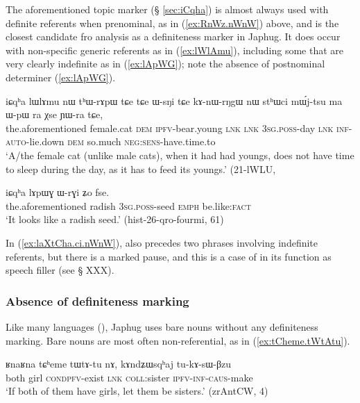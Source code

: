 The aforementioned topic marker  (§ \ref{sec:iCqha}) is almost always used with definite referents when prenominal, as in (\ref{ex:RnWz.nWnW}) above, and is the closest candidate fro analysis as a definiteness marker in Japhug. It does occur with non-specific generic referents as in (\ref{ex:lWlAmu}), including some that are very clearly indefinite as in (\ref{ex:lApWG}); note the absence of postnominal determiner  (\ref{ex:lApWG}).

\begin{exe}
\ex \label{ex:lWlAmu}
 \gll iɕqʰa lɯlɤmu nɯ tʰɯ-rɤpɯ tɕe tɕe ɯ-sŋi tɕe kɤ-nɯ-rŋgɯ nɯ stʰɯci mɯ́j-tsu ma ɯ-pɯ ra χse ɲɯ-ra tɕe, \\
 the.aforementioned female.cat \textsc{dem} \textsc{ipfv}-bear.young \textsc{lnk} \textsc{lnk} \textsc{3sg}.\textsc{poss}-day \textsc{lnk} \textsc{inf}-\textsc{auto}-lie.down \textsc{dem} so.much \textsc{neg}:\textsc{sens}-have.time.to \\
 \glt `A/the female cat (unlike male cats), when it had had youngs, does not have time to sleep during the day, as it has to feed its youngs.' (21-lWLU, 
\end{exe}

\begin{exe}
\ex \label{ex:lApWG}
\gll  iɕqʰa lɤpɯɣ ɯ-rɣi ʑo fse. \\
the.aforementioned radish \textsc{3sg}.\textsc{poss}-seed \textsc{emph} be.like:\textsc{fact} \\
\glt `It looks like a radish seed.' (hist-26-qro-fourmi, 61)
\end{exe}

In  (\ref{ex:laXtCha.ci.nWnW}),   also precedes two phrases involving indefinite referents, but  there is a marked pause, and this is a case of  in its function as speech filler (see § XXX).

\subsubsection{Absence of definiteness marking}
Like many languages (\citealt[130]{creissels06sgit1}), Japhug uses bare nouns without any definiteness marking. Bare nouns are most often non-referential, as  in (\ref{ex:tCheme.tWtAtu}).

\begin{exe}
\ex \label{ex:tCheme.tWtAtu}
\gll ʁnaʁna tɕʰeme tɯ\redp{}tɤ-tu nɤ, kɤndʑɯsqʰaj tu-kɤ-sɯ-βzu \\
both girl \textsc{cond}\redp{}\textsc{pfv}-exist \textsc{lnk} \textsc{coll}:sister \textsc{ipfv}-\textsc{inf}-\textsc{caus}-make \\
\glt `If both of them have girls, let them be sisters.' (zrAntCW, 4)
\end{exe}

